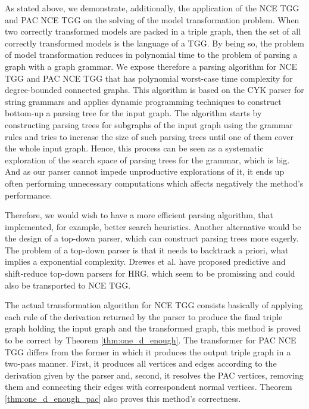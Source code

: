 As stated above, we demonstrate, additionally, the application of the NCE TGG and PAC NCE TGG on the solving of the model transformation problem. When two correctly transformed models are packed in a triple graph, then the set of all correctly transformed models is the language of a TGG. By being so, the problem of model transformation reduces in polynomial time to the problem of parsing a graph with a graph grammar. We expose therefore a parsing algorithm for NCE TGG \cite{rozenberg1986boundary} and PAC NCE TGG that has polynomial worst-case time complexity for degree-bounded connected graphs. This algorithm is based on the CYK parser for string grammars and applies dynamic programming techniques to construct bottom-up a parsing tree for the input graph. The algorithm starts by constructing parsing trees for subgraphs of the input graph using the grammar rules and tries to increase the size of such parsing trees until one of them cover the whole input graph. Hence, this process can be seen as a systematic exploration of the search space of parsing trees for the grammar, which is big. And as our parser cannot impede unproductive explorations of it, it ends up often performing unnecessary computations which affects negatively the method's performance.

Therefore, we would wish to have a more efficient parsing algorithm, that implemented, for example, better search heuristics. Another alternative would be the design of a top-down parser, which can construct parsing trees more eagerly. The problem of a top-down parser is that it needs to backtrack a priori, what implies a exponential complexity. Drewes et al. \cite{drewes2015predictive,drewes2017predictive} have proposed predictive and shift-reduce top-down parsers for HRG, which seem to be promissing and could also be transported to NCE TGG.
 
The actual transformation algorithm for NCE TGG consists basically of applying each rule of the derivation returned by the parser to produce the final triple graph holding the input graph and the transformed graph, this method is proved to be correct by Theorem \ref{thm:one_d_enough}. The transformer for PAC NCE TGG differs from the former in which it produces the output triple graph in a two-pass manner. First, it produces all vertices and edges according to the derivation given by the parser and, second, it resolves the PAC vertices, removing them and connecting their edges with correspondent normal vertices. Theorem \ref{thm:one_d_enough_pac} also proves this method's correctness.

